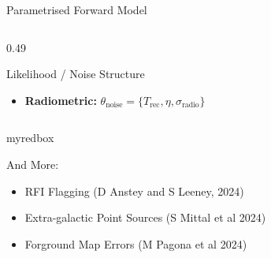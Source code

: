 \documentclass{beamer}
\begin{document}
\begin{frame}{Parametrised Forward Model}
\begin{columns}
\begin{column}{0.49\textwidth}
\begin{block}{Likelihood / Noise Structure}
\begin{itemize}
\item \textbf{Radiometric:} \(\theta_{\mathrm{noise}} = \{T_{\mathrm{rec}}, \eta, \sigma_{\mathrm{radio}}\}\)
\end{itemize}
\end{block}

\end{column}
\end{columns}

\vspace{-14em}
\begin{center}
\begin{beamercolorbox}[
    wd=\textwidth,
    rounded=true,
    shadow=true,
    sep=1em
]{myredbox}

And More:\\[5pt]
\begin{itemize}
    \item RFI Flagging (D Anstey and S Leeney, 2024)
    \item Extra-galactic Point Sources (S Mittal et al 2024)
    \item Forground Map Errors (M Pagona et al 2024)
\end{itemize}
\end{beamercolorbox}


\end{center}
\end{frame}
\end{document}
